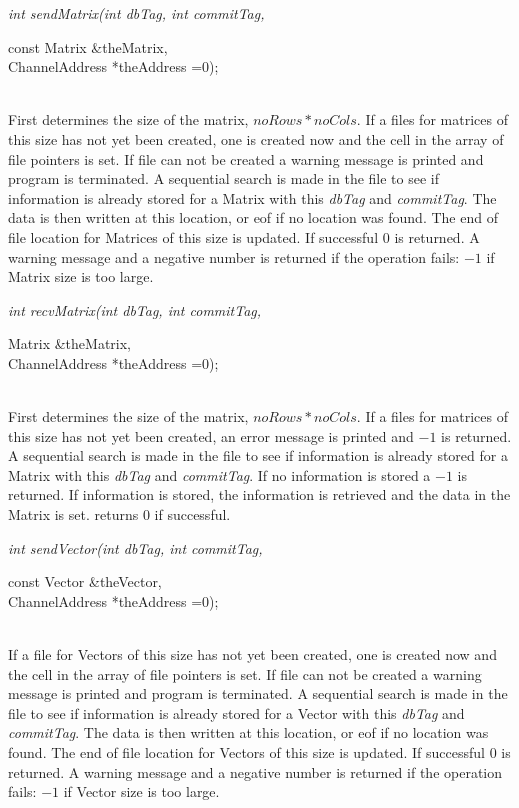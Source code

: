 {\em int sendMatrix(int dbTag, int commitTag,  

\indent\indent\indent\indent\indent		   const Matrix \&theMatrix, \\
\indent\indent\indent\indent\indent		   ChannelAddress *theAddress =0);}\\
First determines the size of the matrix, $noRows * noCols$. If a files
for matrices of this size has not yet been created, one is created now
and the cell in the array of file pointers is set. If file can not be
created a warning message is printed and program is terminated. A sequential search
is made in the file to see if information is already stored for a Matrix with
this {\em dbTag} and {\em commitTag}. The data is then written at this
location, or eof if no location was found. The end of file location
for Matrices of this size is updated. If successful $0$ is
returned. A warning message and a negative number is returned if the
operation fails: $-1$ if Matrix size is too large. \\

{\em int recvMatrix(int dbTag, int commitTag, 

\indent\indent\indent\indent\indent Matrix \&theMatrix,  \\
\indent\indent\indent\indent\indent ChannelAddress *theAddress =0);}\\
First determines the size of the matrix, $noRows * noCols$. If a files
for matrices of this size has not yet been created, an error message
is printed and $-1$ is returned.  A sequential search
is made in the file to see if information is already stored for a Matrix with
this {\em dbTag} and {\em commitTag}. If no information is stored a
$-1$ is returned. If information is stored, the information is
retrieved and the data in the Matrix is set. returns $0$ if
successful. \\

{\em int sendVector(int dbTag, int commitTag, 

\indent\indent\indent\indent\indent const Vector \&theVector, \\
\indent\indent\indent\indent\indent ChannelAddress *theAddress =0);}\\
If a file
for Vectors of this size has not yet been created, one is created now
and the cell in the array of file pointers is set. If file can not be
created a warning message is printed and program is terminated. A sequential search
is made in the file to see if information is already stored for a Vector with
this {\em dbTag} and {\em commitTag}. The data is then written at this
location, or eof if no location was found. The end of file location
for Vectors of this size is updated. If successful $0$ is
returned. A warning message and a negative number is returned if the
operation fails: $-1$ if Vector size is too large. \\


